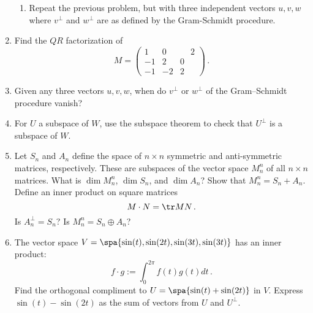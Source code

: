 \begin{enumerate}
\begin{enumerate}
\item Repeat the previous problem, but with three independent vectors $u,v,w$
 where $v^\perp$ and $w^\perp$ are as defined by the Gram-Schmidt procedure. 
\end{enumerate}



\item \label{QRprob} Find the $QR$ factorization of
\[
M=\begin{pmatrix}1&0&\phantom{\!-}2\\-1&2&0\\-1&-2&2
\end{pmatrix}\, .
\]


\item Given any three vectors $u,v,w$, when do $v^\perp$ or $w^\perp$ of the Gram--Schmidt procedure vanish?


\item For $U$ a subspace of $W$, use the subspace theorem to check that $U^\perp$ is a subspace of $W$.




\item %
Let $S_n$ and $A_n$ define the space of $n \times n$ symmetric and anti-symmetric matrices, respectively. These are subspaces of the vector space $M^n_n$ of all $n\times n$ matrices. What is $\dim M^n_n$, $\dim S_n$, and $\dim A_n$? Show that $M^n_n = S_n + A_n$. Define an inner product on square matrices
\[
M\cdot N =\tr MN\, .
\]
Is $A_n^{\perp}=S_n$? Is $M^n_n = S_n \oplus A_n$?


\item The vector space $V=\spa\{ \sin(t),\sin(2t), \sin(3t) , \sin(3t)\}$ has an inner product: 
\[f\cdot g:=\int _0^{2\pi}f(t)g(t) dt\, .\] Find the orthogonal compliment to $U=\spa\{ \sin(t)+\sin(2t) \}$ in $V$. Express $\sin(t)-\sin(2t)$ as  the sum of vectors from $U$ and $U^\perp$.

\end{enumerate}

